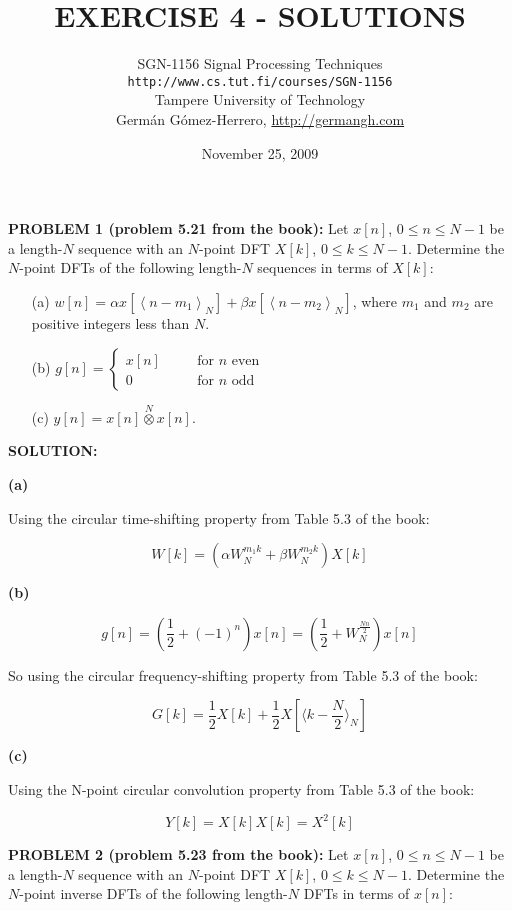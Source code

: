 \documentclass[a4paper,11pt,oneside]{article}
\title{\large{\textbf{EXERCISE 4 - SOLUTIONS}}}
\author{SGN-1156 Signal Processing Techniques\\
\texttt{http://www.cs.tut.fi/courses/SGN-1156}\\
Tampere University of Technology\\
Germ\'an G\'omez-Herrero, \url{http://germangh.com}}
\date{November 25, 2009}
\begin{document}
\maketitle

\noindent \textbf{PROBLEM 1 (problem 5.21 from the book):} Let $x[n]$, $0\leq n \leq N-1$ be a length-$N$ sequence with an $N$-point DFT $X[k]$, $0 \leq k \leq N-1$. Determine the $N$-point DFTs of the following length-$N$ sequences in terms of $X[k]$:

\begin{itemize}
\item[(a)] $w[n]=\alpha x[\left\langle n-m_1\right\rangle_{N}]+\beta x[\left\langle n-m_2\right\rangle_{N}]$, where $m_1$ and $m_2$ are positive integers less than $N$.
\item[(b)] $g[n]=\left\{\begin{array}{lll}x[n]&\quad&\textrm{for } n \textrm{ even}\\0&\quad&\textrm{for } n \textrm{ odd}\end{array}\right.$
\item[(c)] $y[n]=x[n]\stackrel{N}{\otimes} x[n]$. 
\end{itemize}

\vspace{1cm}
\textbf{SOLUTION:}

\textbf{(a)}

Using the circular time-shifting property from Table 5.3 of the book:

\[
W[k] = \left(\alpha W_N^{m_1k}+\beta W_N^{m_2k}\right)X[k]
\]

\textbf{(b)}


\[
g[n] = \left(\frac{1}{2}+(-1)^n\right)x[n]=\left(\frac{1}{2}+W_N^{\frac{Nn}{2}}\right)x[n]
\]

\noindent So using the circular frequency-shifting property from Table 5.3 of the book:

\[
G[k]=\frac{1}{2}X[k]+\frac{1}{2}X\left[\langle k-\frac{N}{2}\rangle_N\right]
\]


\textbf{(c)}

Using the N-point circular convolution property from Table 5.3 of the book:

\[
Y[k] = X[k]X[k]=X^2[k]
\]



\vspace{1cm}

\noindent \textbf{PROBLEM 2 (problem 5.23 from the book):} Let $x[n]$, $0\leq n \leq N-1$ be a length-$N$ sequence with an $N$-point DFT $X[k]$, $0\leq k \leq N-1$. Determine the $N$-point inverse DFTs of the following length-$N$ DFTs in terms of $x[n]$:
\end{document}
